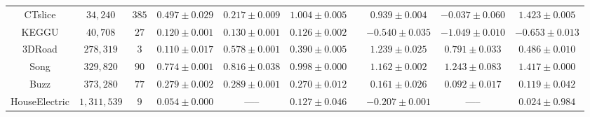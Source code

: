 \begin{tabular}{ cccccccccc }
	CTslice              & $34,\!240$         & $385$ &   $0.497\pm 0.029$                    & $\mathbf{0.217}\pm 0.009$ & $1.004\pm 0.005$ &&   $0.939\pm 0.004$          &  $\mathbf{-0.037}\pm 0.060$    &   $1.423\pm 0.005$             \\
	KEGGU                & $40,\!708$         & $27$  &   $\mathbf{0.120}\pm 0.001$           & $0.130\pm 0.001$ & $0.126\pm 0.002$          &&  $-0.540\pm 0.035$          &  $\mathbf{-1.049}\pm 0.010$    &  $-0.653\pm 0.013$             \\
	3DRoad               & $278,\!319$        & $3$   &   $\mathbf{0.110}\pm 0.017$           & $0.578\pm 0.001$ & $0.390\pm 0.005$          &&   $1.239\pm 0.025$          &   $0.791\pm 0.033$             &   $\mathbf{0.486}\pm 0.010$    \\
	Song                 & $329,\!820$        & $90$  &   $\mathbf{0.774}\pm 0.001$           & $0.816\pm 0.038$ & $0.998\pm 0.000$          &&   $\mathbf{1.162}\pm 0.002$ &   $1.243\pm 0.083$             &   $1.417\pm 0.000$             \\
	Buzz                 & $373,\!280$        & $77$  &   $0.279\pm 0.002$                    & $0.289\pm 0.001$ & $\mathbf{0.270}\pm 0.012$ &&   $0.161\pm 0.026$          &   $\mathbf{0.092}\pm 0.017$    &   $0.119\pm 0.042$             \\
	HouseElectric        & $1,\!311,\!539$    & $9$   &   $\mathbf{0.054}\pm 0.000$           & -----            & $0.127\pm 0.046$          &&  $\mathbf{-0.207}\pm 0.001$ & -----                          &   $0.024\pm 0.984$             \\
  \bottomrule
\end{tabular}
